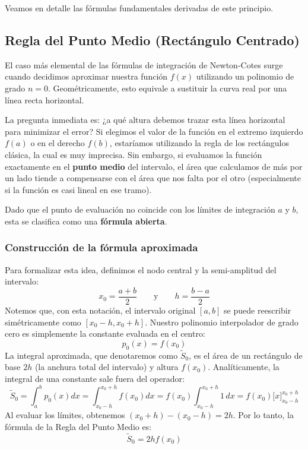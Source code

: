 Veamos en detalle las fórmulas fundamentales derivadas de este principio.

\subsection{Regla del Punto Medio (Rectángulo Centrado)}

El caso más elemental de las fórmulas de integración de Newton-Cotes surge cuando decidimos aproximar nuestra función $f(x)$ utilizando un polinomio de grado $n = 0$. Geométricamente, esto equivale a sustituir la curva real por una línea recta horizontal. 

La pregunta inmediata es: ¿a qué altura debemos trazar esta línea horizontal para minimizar el error? Si elegimos el valor de la función en el extremo izquierdo $f(a)$ o en el derecho $f(b)$, estaríamos utilizando la regla de los rectángulos clásica, la cual es muy imprecisa. Sin embargo, si evaluamos la función exactamente en el \textbf{punto medio} del intervalo, el área que calculamos de más por un lado tiende a compensarse con el área que nos falta por el otro (especialmente si la función es casi lineal en ese tramo). 

Dado que el punto de evaluación no coincide con los límites de integración $a$ y $b$, esta se clasifica como una \textbf{fórmula abierta}.

\subsubsection{Construcción de la fórmula aproximada}

Para formalizar esta idea, definimos el nodo central y la semi-amplitud del intervalo:
\[
    x_0 = \frac{a+b}{2} \qquad \text{y} \qquad h = \frac{b - a}{2}
\]
Notemos que, con esta notación, el intervalo original $[a, b]$ se puede reescribir simétricamente como $[x_0 - h, x_0 + h]$. Nuestro polinomio interpolador de grado cero es simplemente la constante evaluada en el centro:
\[
    p_0(x) = f(x_0)
\]
La integral aproximada, que denotaremos como $\widetilde{S}_0$, es el área de un rectángulo de base $2h$ (la anchura total del intervalo) y altura $f(x_0)$. Analíticamente, la integral de una constante sale fuera del operador:
\[
    \widetilde{S}_0 = \int_a^b p_0(x) dx = \int_{x_0-h}^{x_0+h} f(x_0) dx = f(x_0) \int_{x_0-h}^{x_0+h} 1 \, dx = f(x_0) \Big[ x \Big]_{x_0-h}^{x_0+h} 
\]
Al evaluar los límites, obtenemos $(x_0+h) - (x_0-h) = 2h$. Por lo tanto, la fórmula de la Regla del Punto Medio es:
\[
    \boxed{\widetilde{S}_0 = 2h f(x_0)}
\]

